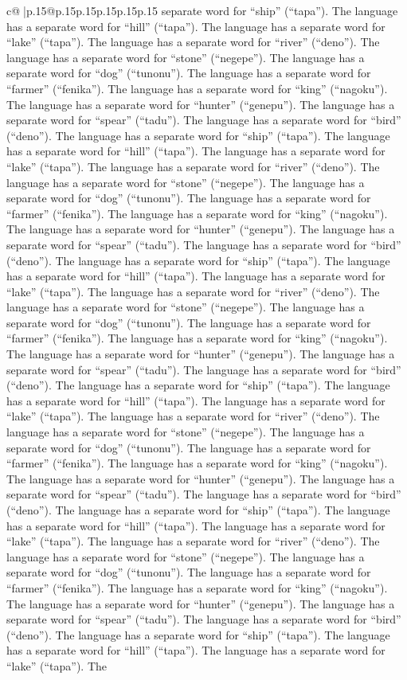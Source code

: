 \documentclass{article}
\begin{document}
{\begin{supertabular}{c@{$\;$}|p{.15\linewidth}@{}p{.15\linewidth}p{.15\linewidth}p{.15\linewidth}p{.15\linewidth}p{.15\linewidth}}
{{{separate word for “ship” (“tapa”). The language has a separate word for “hill” (“tapa”). The language has a separate word for “lake” (“tapa”). The language has a separate word for “river” (“deno”). The language has a separate word for “stone” (“negepe”). The language has a separate word for “dog” (“tunonu”). The language has a separate word for “farmer” (“fenika”). The language has a separate word for “king” (“nagoku”). The language has a separate word for “hunter” (“genepu”). The language has a separate word for “spear” (“tadu”). The language has a separate word for “bird” (“deno”). The language has a separate word for “ship” (“tapa”). The language has a separate word for “hill” (“tapa”). The language has a separate word for “lake” (“tapa”). The language has a separate word for “river” (“deno”). The language has a separate word for “stone” (“negepe”). The language has a separate word for “dog” (“tunonu”). The language has a separate word for “farmer” (“fenika”). The language has a separate word for “king” (“nagoku”). The language has a separate word for “hunter” (“genepu”). The language has a separate word for “spear” (“tadu”). The language has a separate word for “bird” (“deno”). The language has a separate word for “ship” (“tapa”). The language has a separate word for “hill” (“tapa”). The language has a separate word for “lake” (“tapa”). The language has a separate word for “river” (“deno”). The language has a separate word for “stone” (“negepe”). The language has a separate word for “dog” (“tunonu”). The language has a separate word for “farmer” (“fenika”). The language has a separate word for “king” (“nagoku”). The language has a separate word for “hunter” (“genepu”). The language has a separate word for “spear” (“tadu”). The language has a separate word for “bird” (“deno”). The language has a separate word for “ship” (“tapa”). The language has a separate word for “hill” (“tapa”). The language has a separate word for “lake” (“tapa”). The language has a separate word for “river” (“deno”). The language has a separate word for “stone” (“negepe”). The language has a separate word for “dog” (“tunonu”). The language has a separate word for “farmer” (“fenika”). The language has a separate word for “king” (“nagoku”). The language has a separate word for “hunter” (“genepu”). The language has a separate word for “spear” (“tadu”). The language has a separate word for “bird” (“deno”). The language has a separate word for “ship” (“tapa”). The language has a separate word for “hill” (“tapa”). The language has a separate word for “lake” (“tapa”). The language has a separate word for “river” (“deno”). The language has a separate word for “stone” (“negepe”). The language has a separate word for “dog” (“tunonu”). The language has a separate word for “farmer” (“fenika”). The language has a separate word for “king” (“nagoku”). The language has a separate word for “hunter” (“genepu”). The language has a separate word for “spear” (“tadu”). The language has a separate word for “bird” (“deno”). The language has a separate word for “ship” (“tapa”). The language has a separate word for “hill” (“tapa”). The language has a separate word for “lake” (“tapa”). The }}}
\end{supertabular}}
\end{document}
